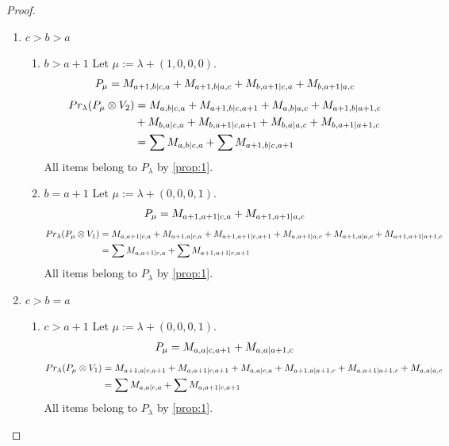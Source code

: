 \documentclass[12pt,a4paper]{article}
\begin{document}
\begin{proof}
\begin{enumerate}
\item $c>b>a$
  \begin{enumerate}
    \item $b>a+1$
        Let $\mu:=\lambda + (1,0,0,0) $. 
\begin{equation}\notag
  \begin{aligned}
      P_{\mu} =M_{a+1,b|c,a}
+M_{a+1,b|a,c}
+M_{b,a+1|c,a}
+M_{b,a+1|a,c}
  \end{aligned}
\end{equation}
\begin{equation}\notag
  \begin{aligned}
  Pr_{\lambda}(P_\mu \otimes V_2) &=
M_{a,b|c,a}
+M_{a+1,b|c,a+1}
+M_{a,b|a,c}
+M_{a+1,b|a+1,c} \\
                                  &+
M_{b,a|c,a}
+M_{b,a+1|c,a+1}
+M_{b,a|a,c}
+M_{b,a+1|a+1,c} \\
                                  &=
\sum M_{a,b|c,a}
+\sum M_{a+1,b|c,a+1}
  \end{aligned}
\end{equation}
All items belong to $P_\lambda$ by \cref{prop:1}.
    
\item $b=a+1$
        Let $\mu:=\lambda + (0,0,0,1) $. 
\begin{equation}\notag
  \begin{aligned}
      P_{\mu} =
M_{a+1,a+1|c,a}
+M_{a+1,a+1|a,c}
  \end{aligned}
\end{equation}
\begin{equation}\notag
  \begin{aligned}
  Pr_{\lambda}(P_\mu \otimes V_1) &=
M_{a,a+1|c,a}
+M_{a+1,a|c,a}
+M_{a+1,a+1|c,a+1}
+M_{a,a+1|a,c}
+M_{a+1,a|a,c}
+M_{a+1,a+1|a+1,c}\\
                                  &=
\sum M_{a,a+1|c,a}
+\sum M_{a+1,a+1|c,a+1}
  \end{aligned}
\end{equation}
All items belong to $P_\lambda$ by \cref{prop:1}.
  \end{enumerate}
  
\item $c>b=a$
  \begin{enumerate}
    \item $c>a+1$
        Let $\mu:=\lambda + (0,0,0,1) $. 
\begin{equation}\notag
  \begin{aligned}
      P_{\mu} =M_{a,a|c,a+1}
+M_{a,a|a+1,c}
  \end{aligned}
\end{equation}
\begin{equation}\notag
  \begin{aligned}
  Pr_{\lambda}(P_\mu \otimes V_1) &=
M_{a+1,a|c,a+1}
+M_{a,a+1|c,a+1}
+M_{a,a|c,a}
+M_{a+1,a|a+1,c}
+M_{a,a+1|a+1,c}
+M_{a,a|a,c} \\
                                  &=
\sum M_{a,a|c,a}
+\sum M_{a,a+1|c,a+1}
  \end{aligned}
\end{equation}
All items belong to $P_\lambda$ by \cref{prop:1}.


\end{enumerate}
\end{enumerate}
\end{proof}
\end{document}
